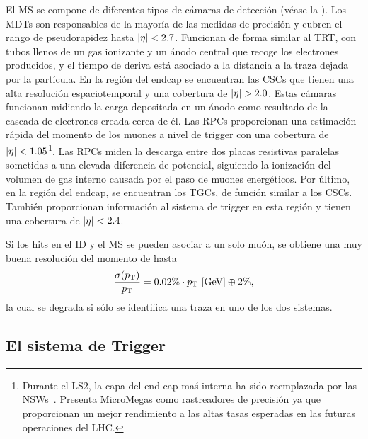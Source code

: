 El \ac{MS} se compone de diferentes tipos de cámaras de detección (véase la \Fig{\ref{fig:atlas:atlas:muon_spectrometer:muon_spectrometer}}). Los \acp{MDT} son responsables de la mayoría de las medidas de precisión y cubren el rango de pseudorapidez hasta \(|\eta|<2.7\). Funcionan de forma similar al \ac{TRT}, con tubos llenos de un gas ionizante y un ánodo central que recoge los electrones producidos, y el tiempo de deriva está asociado a la distancia a la traza dejada por la part\'icula. En la región del endcap se encuentran las \acp{CSC} que tienen una alta resolución espaciotemporal y una cobertura de \(\abseta>2.0\). Estas cámaras funcionan midiendo la carga depositada en un ánodo como resultado de la cascada de electrones creada cerca de \'el. Las \acp{RPC} proporcionan una estimación rápida del momento de los muones a nivel de trigger con una cobertura de \(|\eta|<1.05\)\footnote{Durante el \ac{LS2}, la capa del end-cap ma\'s interna ha sido reemplazada por las \acp{NSW}~\cite{ATLAS-NSW}. Presenta MicroMegas como rastreadores de precisión ya que proporcionan un mejor rendimiento a las altas tasas esperadas en las futuras operaciones del LHC.}. Las \acp{RPC} miden la descarga entre dos placas resistivas paralelas sometidas a una elevada diferencia de potencial, siguiendo la ionización del volumen de gas interno causada por el paso de muones energéticos. Por último, en la región del endcap, se encuentran los \acp{TGC}, de función similar a los \acp{CSC}. También proporcionan información al sistema de trigger en esta región y tienen una cobertura de \(|\eta|<2.4\).

Si los hits en el \ac{ID} y el \ac{MS} se pueden asociar a un solo muón, se obtiene una muy buena resolución del momento de hasta
\begin{equation}
    \frac{\sigma(p_{\text{T}})}{p_{\text{T}}} = 
    0.02\% \cdot p_{\text{T}}~[\text{GeV}] \oplus 2\%,
\end{equation}
la cual se degrada si sólo se identifica una traza en uno de los dos sistemas.






\subsection{El sistema de Trigger}



